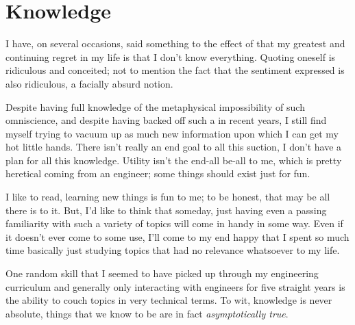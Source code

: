 \documentclass[../butidigress.tex]{subfiles}
\begin{document}
\chapter{Knowledge}\label{chap:knowledge}
\newpage

I have, on several occasions, said something to the effect of that my greatest and continuing regret in my life is that I don't know everything.
Quoting oneself is ridiculous and conceited; not to mention the fact that the sentiment expressed is also ridiculous, a facially absurd notion.

Despite having full knowledge of the metaphysical impossibility of such omniscience, and despite having backed off such a  in recent years, I still find myself trying to vacuum up as much new information upon which I can get my hot little hands.
There isn't really an end goal to all this suction, I don't have a plan for  all this knowledge.
Utility isn't the end-all be-all to me, which is pretty heretical coming from an engineer; some things should exist just for fun.

I like to read, learning new things is fun to me; to be honest, that may be all there is to it.
But, I'd like to think that someday, just having even a passing familiarity with such a variety of topics will come in handy in some way.
Even if it doesn't ever come to some use, I'll come to my end happy that I spent so much time basically just studying topics that had no relevance whatsoever to my life.

One random skill that I seemed to have picked up through my engineering curriculum and generally only interacting with engineers for five straight years is the ability to couch topics in very technical terms.
To wit, knowledge is never absolute, things that we know to be  are in fact \emph{asymptotically true}.
\end{document}

